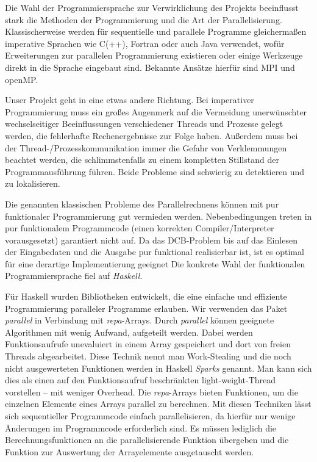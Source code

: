 \documentclass[a4paper]{scrartcl}
\begin{document}
Die Wahl der Programmiersprache zur Verwirklichung des Projekts beeinflusst stark die Methoden der Programmierung und die Art der Parallelisierung. Klassischerweise werden für sequentielle und parallele Programme gleichermaßen imperative Sprachen wie C(++), Fortran oder auch Java verwendet, wofür Erweiterungen zur parallelen Programmierung existieren oder einige Werkzeuge direkt in die Sprache eingebaut sind. Bekannte Ansätze hierfür sind MPI und openMP. \par
Unser Projekt geht in eine etwas andere Richtung. Bei imperativer Programmierung muss ein großes Augenmerk auf die Vermeidung unerwünschter wechselseitiger Beeinflussungen verschiedener Threads und Prozesse gelegt werden, die fehlerhafte Rechenergebnisse zur Folge haben. Außerdem muss bei der Thread-/Prozesskommunikation immer die Gefahr von Verklemmungen beachtet werden, die schlimmstenfalls zu einem kompletten Stillstand der Programmausführung führen. Beide Probleme sind schwierig zu detektieren und zu lokalisieren.\par
Die genannten klassischen Probleme des Parallelrechnens können mit pur funktionaler Programmierung gut vermieden werden. Nebenbedingungen treten in pur funktionalem Programmcode (einen korrekten Compiler/Interpreter vorausgesetzt) garantiert nicht auf. Da das DCB-Problem bis auf das Einlesen der Eingabedaten und die Ausgabe pur funktional realisierbar ist, ist es optimal für eine derartige Implementierung geeignet Die konkrete Wahl der funktionalen Programmiersprache fiel auf \emph{Haskell}. \par
\medskip
Für Haskell wurden Bibliotheken entwickelt, die eine einfache und effiziente Programmierung paralleler Programme erlauben. Wir verwenden das Paket \emph{parallel} in Verbindung mit \emph{repa}-Arrays. Durch \emph{parallel} können geeignete Algorithmen mit wenig Aufwand, aufgeteilt werden. Dabei werden Funktionsaufrufe unevaluiert in einem Array gespeichert und dort von freien Threads abgearbeitet. Diese Technik nennt man Work-Stealing und die noch nicht ausgewerteten Funktionen werden in Haskell \emph{Sparks} genannt.
Man kann sich dies als einen auf den Funktionsaufruf beschränkten light-weight-Thread vorstellen -- mit weniger Overhead. Die \emph{repa}-Arrays bieten Funktionen, um die einzelnen Elemente eines Arrays parallel zu berechnen. Mit diesen Techniken lässt sich sequentieller Programmcode einfach parallelisieren, da hierfür nur wenige Änderungen im Programmcode erforderlich sind. Es müssen lediglich die Berechnungsfunktionen an die parallelisierende Funktion übergeben und die Funktion zur Auswertung der Arrayelemente ausgetauscht werden. \par
\end{document}
